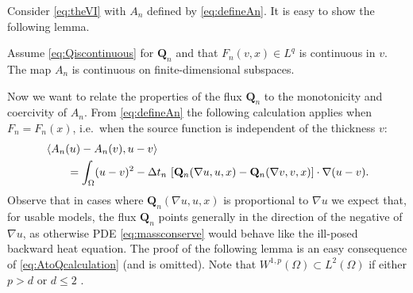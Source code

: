 \documentclass[final,onefignum]{siamart190516}
\newcommand\bQ{\mathbf{Q}}
\newcommand{\grad}{\nabla}
\newcommand{\ip}[2]{\ensuremath{\left<#1,#2\right>}}
\newcommand\RR{\mathbb{R}}
\begin{document}
Consider \eqref{eq:theVI} with $A_n$ defined by \eqref{eq:defineAn}.  It is easy to show the following lemma.

\begin{lemma}  \label{lem:continuous}  Assume \eqref{eq:Qiscontinuous} for $\bQ_n$ and that $F_n(v,x)\in L^q$ is continuous in $v$.  The map $A_n$ is continuous on finite-dimensional subspaces.
\end{lemma}


Now we want to relate the properties of the flux $\bQ_n$ to the monotonicity and coercivity of $A_n$.  From \eqref{eq:defineAn} the following calculation applies when $F_n=F_n(x)$, i.e.~when the source function is independent of the thickness $v$:
\begin{align}
   &\ip{A_n(u) - A_n(v)}{u-v}  \label{eq:AtoQcalculation} \\
   &\qquad = \int_\Omega (u-v)^2 - \Delta t_n\, \left[\bQ_n(\grad u,u,x) - \bQ_n(\grad v,v,x)\right] \cdot \grad(u-v).  \notag
\end{align}
Observe that in cases where $\bQ_n(\grad u,u,x)$ is proportional to $\grad u$ we expect that, for usable models, the flux $\bQ_n$ points generally in the direction of the negative of $\grad u$, as otherwise PDE \eqref{eq:massconserve} would behave like the ill-posed backward heat equation.  The proof of the following lemma is an easy consequence of \eqref{eq:AtoQcalculation} (and is omitted).  Note that $W^{1,p}(\Omega) \subset L^2(\Omega)$ if either $p>d$ or $d\le 2$ \cite[theorems 5.6.2 and 5.6.5]{Evans2010}.
\end{document}
